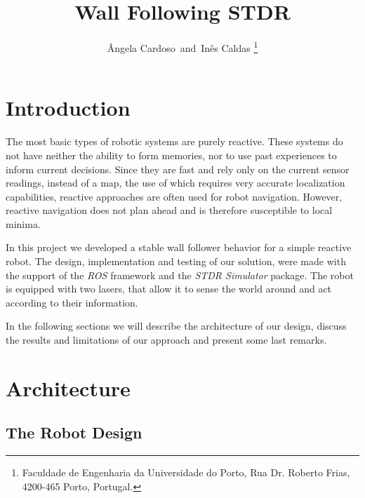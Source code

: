 \documentclass[10pt,journal,compsoc]{IEEEtran}
\begin{document}
\title{Wall Following STDR}
\author{\^{A}ngela Cardoso~and~In\^{e}s Caldas%
\thanks{Faculdade de Engenharia da Universidade do Porto, Rua Dr. Roberto Frias, 4200-465 Porto, Portugal.}}


\maketitle

\section{Introduction}
The most basic types of robotic systems are purely reactive. These systems do not have neither the ability to form memories, nor to use past experiences to inform current decisions. Since they are fast and rely only on the current sensor readings, instead of a map, the use of which requires very accurate localization capabilities, reactive approaches are often used for robot navigation. However, reactive navigation does not plan ahead and is therefore susceptible to local minima. 

In this project we developed a stable wall follower behavior for a simple reactive robot. The design, implementation and testing of our solution, were made with the support of the \textit{ROS} framework and the \textit{STDR Simulator} package. The robot is equipped with two lasers, that allow it to sense the world around and act according to their information. 

In the following sections we will describe the architecture of our design, discuss the results and limitations of our approach and present some last remarks.


\section{Architecture}
\subsection{The Robot Design}
\end{document}
